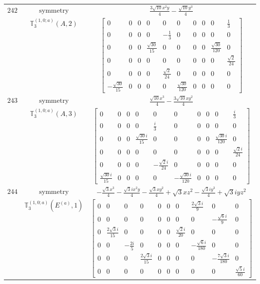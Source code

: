 \documentclass[fleqn,8pt,landscape]{jsarticle}
\begin{document}
\begin{longtable}{ccc}
$ 242 $ & $ \text{symmetry} $ & $ \frac{3 \sqrt{10} x^{2} y}{4} - \frac{\sqrt{10} y^{3}}{4} $ \\
$  $ & $ \mathbb{T}_{3}^{(1,0;a)}(A,2) $ & $ \begin{bmatrix} 0 & 0 & 0 & 0 & 0 & 0 & 0 & 0 & 0 & \frac{1}{3} \\ 0 & 0 & 0 & 0 & - \frac{1}{3} & 0 & 0 & 0 & 0 & 0 \\ 0 & 0 & 0 & \frac{\sqrt{30}}{15} & 0 & 0 & 0 & 0 & \frac{\sqrt{30}}{120} & 0 \\ 0 & 0 & 0 & 0 & 0 & 0 & 0 & 0 & 0 & \frac{\sqrt{2}}{24} \\ 0 & 0 & 0 & 0 & \frac{\sqrt{2}}{24} & 0 & 0 & 0 & 0 & 0 \\ - \frac{\sqrt{30}}{15} & 0 & 0 & 0 & 0 & \frac{\sqrt{30}}{120} & 0 & 0 & 0 & 0 \end{bmatrix} $ \\ \hline
$ 243 $ & $ \text{symmetry} $ & $ \frac{\sqrt{10} x^{3}}{4} - \frac{3 \sqrt{10} x y^{2}}{4} $ \\
$  $ & $ \mathbb{T}_{3}^{(1,0;a)}(A,3) $ & $ \begin{bmatrix} 0 & 0 & 0 & 0 & 0 & 0 & 0 & 0 & 0 & \frac{i}{3} \\ 0 & 0 & 0 & 0 & \frac{i}{3} & 0 & 0 & 0 & 0 & 0 \\ 0 & 0 & 0 & \frac{\sqrt{30} i}{15} & 0 & 0 & 0 & 0 & \frac{\sqrt{30} i}{120} & 0 \\ 0 & 0 & 0 & 0 & 0 & 0 & 0 & 0 & 0 & \frac{\sqrt{2} i}{24} \\ 0 & 0 & 0 & 0 & - \frac{\sqrt{2} i}{24} & 0 & 0 & 0 & 0 & 0 \\ \frac{\sqrt{30} i}{15} & 0 & 0 & 0 & 0 & - \frac{\sqrt{30} i}{120} & 0 & 0 & 0 & 0 \end{bmatrix} $ \\ \hline
$ 244 $ & $ \text{symmetry} $ & $ - \frac{\sqrt{3} x^{3}}{4} - \frac{\sqrt{3} i x^{2} y}{4} - \frac{\sqrt{3} x y^{2}}{4} + \sqrt{3} x z^{2} - \frac{\sqrt{3} i y^{3}}{4} + \sqrt{3} i y z^{2} $ \\
$  $ & $ \mathbb{T}_{3}^{(1,0;a)}(E^{(a)},1) $ & $ \begin{bmatrix} 0 & 0 & 0 & 0 & 0 & 0 & 0 & \frac{2 \sqrt{3} i}{9} & 0 & 0 \\ 0 & 0 & 0 & 0 & 0 & 0 & 0 & 0 & - \frac{\sqrt{6} i}{9} & 0 \\ 0 & \frac{2 \sqrt{3} i}{15} & 0 & 0 & 0 & 0 & \frac{\sqrt{2} i}{20} & 0 & 0 & 0 \\ 0 & 0 & - \frac{2 i}{5} & 0 & 0 & 0 & 0 & - \frac{\sqrt{6} i}{180} & 0 & 0 \\ 0 & 0 & 0 & \frac{2 \sqrt{3} i}{15} & 0 & 0 & 0 & 0 & - \frac{7 \sqrt{3} i}{180} & 0 \\ 0 & 0 & 0 & 0 & 0 & 0 & 0 & 0 & 0 & \frac{\sqrt{5} i}{60} \end{bmatrix} $ \\ \hline

\end{longtable}
\end{document}
